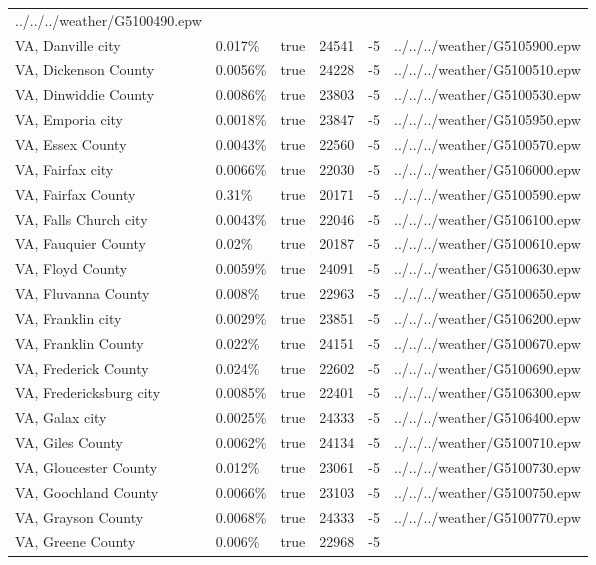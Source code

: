 \begin{longtable}[]{@{}llllll@{}}
../../../weather/G5100490.epw \\
VA, Danville city & 0.017\% & true & 24541 & -5 &
../../../weather/G5105900.epw \\
VA, Dickenson County & 0.0056\% & true & 24228 & -5 &
../../../weather/G5100510.epw \\
VA, Dinwiddie County & 0.0086\% & true & 23803 & -5 &
../../../weather/G5100530.epw \\
VA, Emporia city & 0.0018\% & true & 23847 & -5 &
../../../weather/G5105950.epw \\
VA, Essex County & 0.0043\% & true & 22560 & -5 &
../../../weather/G5100570.epw \\
VA, Fairfax city & 0.0066\% & true & 22030 & -5 &
../../../weather/G5106000.epw \\
VA, Fairfax County & 0.31\% & true & 20171 & -5 &
../../../weather/G5100590.epw \\
VA, Falls Church city & 0.0043\% & true & 22046 & -5 &
../../../weather/G5106100.epw \\
VA, Fauquier County & 0.02\% & true & 20187 & -5 &
../../../weather/G5100610.epw \\
VA, Floyd County & 0.0059\% & true & 24091 & -5 &
../../../weather/G5100630.epw \\
VA, Fluvanna County & 0.008\% & true & 22963 & -5 &
../../../weather/G5100650.epw \\
VA, Franklin city & 0.0029\% & true & 23851 & -5 &
../../../weather/G5106200.epw \\
VA, Franklin County & 0.022\% & true & 24151 & -5 &
../../../weather/G5100670.epw \\
VA, Frederick County & 0.024\% & true & 22602 & -5 &
../../../weather/G5100690.epw \\
VA, Fredericksburg city & 0.0085\% & true & 22401 & -5 &
../../../weather/G5106300.epw \\
VA, Galax city & 0.0025\% & true & 24333 & -5 &
../../../weather/G5106400.epw \\
VA, Giles County & 0.0062\% & true & 24134 & -5 &
../../../weather/G5100710.epw \\
VA, Gloucester County & 0.012\% & true & 23061 & -5 &
../../../weather/G5100730.epw \\
VA, Goochland County & 0.0066\% & true & 23103 & -5 &
../../../weather/G5100750.epw \\
VA, Grayson County & 0.0068\% & true & 24333 & -5 &
../../../weather/G5100770.epw \\
VA, Greene County & 0.006\% & true & 22968 & -5 &

\end{longtable}
